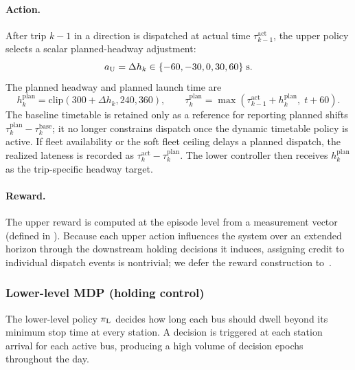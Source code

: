 \paragraph{Action.}
After trip $k-1$ in a direction is dispatched at actual time $\tau^{\mathrm{act}}_{k-1}$, the upper policy selects a scalar planned-headway adjustment:
\begin{equation}
  \label{eq:upper_action}
  a_{\mathrm{U}} = \Delta h_k \in \{-60,-30,0,30,60\}\;\text{s}.
\end{equation}
The planned headway and planned launch time are
\begin{equation}
  \label{eq:timetable_action}
  h^{\mathrm{plan}}_k =
  \mathrm{clip}(300 + \Delta h_k, 240, 360),\qquad
  \tau^{\mathrm{plan}}_k =
  \max(\tau^{\mathrm{act}}_{k-1}+h^{\mathrm{plan}}_k,\; t+60).
\end{equation}
The baseline timetable is retained only as a reference for reporting planned shifts $\tau^{\mathrm{plan}}_k-\tau^{\mathrm{base}}_k$; it no longer constrains dispatch once the dynamic timetable policy is active.
If fleet availability or the soft fleet ceiling delays a planned dispatch, the realized lateness is recorded as $\tau^{\mathrm{act}}_k-\tau^{\mathrm{plan}}_k$.
The lower controller then receives $h^{\mathrm{plan}}_k$ as the trip-specific headway target.

\paragraph{Reward.}
The upper reward is computed at the episode level from a measurement vector (defined in ).
Because each upper action influences the system over an extended horizon through the downstream holding decisions it induces, assigning credit to individual dispatch events is nontrivial; we defer the reward construction to~.

\subsubsection{Lower-level MDP (holding control)}
\label{sec:lower_mdp}

The lower-level policy $\pi_{\mathrm{L}}$ decides how long each bus should dwell beyond its minimum stop time at every station.
A decision is triggered at each station arrival for each active bus, producing a high volume of decision epochs throughout the day.

